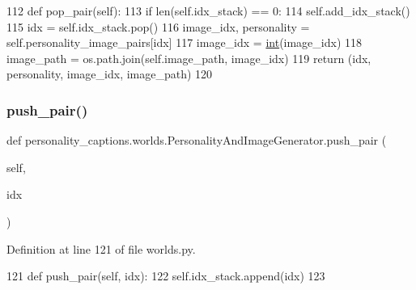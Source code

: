 \begin{DoxyCode}
112     \textcolor{keyword}{def }pop\_pair(self):
113         \textcolor{keywordflow}{if} len(self.idx\_stack) == 0:
114             self.add\_idx\_stack()
115         idx = self.idx\_stack.pop()
116         image\_idx, personality = self.personality\_image\_pairs[idx]
117         image\_idx = \hyperlink{namespacelanguage__model_1_1eval__ppl_a7d12ee00479673c5c8d1f6d01faa272a}{int}(image\_idx)
118         image\_path = os.path.join(self.image\_path, image\_idx)
119         \textcolor{keywordflow}{return} (idx, personality, image\_idx, image\_path)
120 
\end{DoxyCode}
\mbox{\label{classpersonality__captions_1_1worlds_1_1PersonalityAndImageGenerator_a9d4d745f2bc678ff0cae5048f0efc047}} 
\subsubsection{\texorpdfstring{push\+\_\+pair()}{push\_pair()}}
{\footnotesize\ttfamily def personality\+\_\+captions.\+worlds.\+Personality\+And\+Image\+Generator.\+push\+\_\+pair (\begin{DoxyParamCaption}\item[{}]{self,  }\item[{}]{idx }\end{DoxyParamCaption})}



Definition at line 121 of file worlds.\+py.


\begin{DoxyCode}
121     \textcolor{keyword}{def }push\_pair(self, idx):
122         self.idx\_stack.append(idx)
123 
\end{DoxyCode}
\mbox{\label{classpersonality__captions_1_1worlds_1_1PersonalityAndImageGenerator_af76fb5f34ce3555d6e56edf5ad8de390}} 
